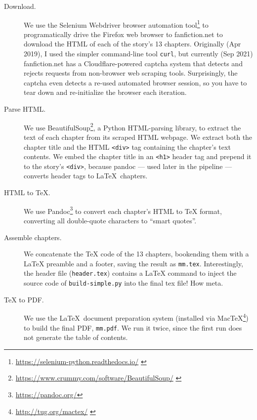\documentclass[ebook,12pt]{memoir}
\begin{document}
\begin{description}

\item[Download.] We use the Selenium Webdriver browser automation tool\footnote{
    \tiny{ \url{https://selenium-python.readthedocs.io/} }
} to programatically drive the Firefox web browser to fanfiction.net to
download the HTML of each of the story's 13 chapters. Originally (Apr 2019),
I used the simpler command-line tool \texttt{curl}, but currently (Sep 2021) fanfiction.net
has a Cloudflare-powered captcha system that detects and rejects requests from non-browser web scraping tools.
Surprisingly, the captcha even detects a re-used automated browser session,
so you have to tear down and re-initialize the browser each iteration.

\item[Parse HTML.] We use BeautifulSoup\footnote{
    \tiny{ \url{https://www.crummy.com/software/BeautifulSoup/} }
}, a Python HTML-parsing library,
to extract the text of each chapter from its scraped HTML webpage.
We extract both the chapter title and the HTML \texttt{<div>} tag containing
the chapter's text contents. We embed the chapter title in an \texttt{<h1>} header tag
and prepend it to the story's \texttt{<div>}, because pandoc --- used later in the pipeline ---
converts header tags to \LaTeX\ chapters. 

\item[HTML to TeX.] We use Pandoc\footnote{\tiny{\url{https://pandoc.org/}}} to convert
each chapter's HTML to TeX format, converting all double-quote characters to ``smart quotes''.

\item[Assemble chapters.] We concatenate the TeX code of the 13 chapters, bookending them with a
LaTeX preamble and a footer, saving the result as \texttt{mm.tex}. Interestingly, the header file (\texttt{header.tex})
contains a LaTeX command to inject the source code of \texttt{build-simple.py} into the final tex file! How meta.

\item[TeX to PDF.] We use the \LaTeX\ document preparation system (installed via MacTeX\footnote{
    \tiny{ \url{http://tug.org/mactex/} }
}) to build the final PDF, \texttt{mm.pdf}. We run it twice, since the first run does not
generate the table of contents.

\end{description}


\normalsize
\cleartorecto


\tableofcontents*  %

\mainmatter         %
\end{document}
